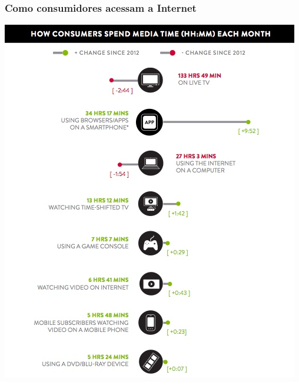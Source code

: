 \documentclass[xcolor=dvipsnames]{beamer}
\begin{document}
\begin{frame}
	\frametitle{Como consumidores acessam a Internet}
 	\includegraphics[scale=0.50]{time_spent.jpg}
\end{frame}
\end{document}
